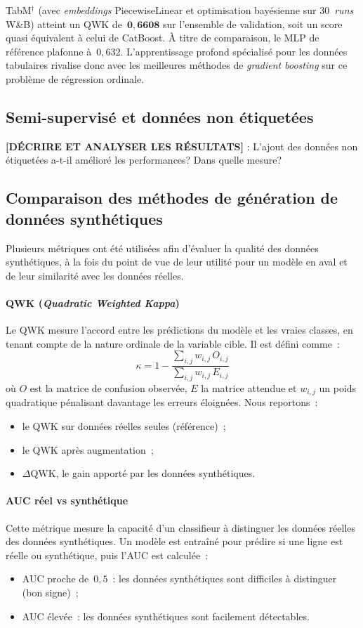 \documentclass[conference]{IEEEtran}
\begin{document}
TabM$^{\dagger}$ (avec \textit{embeddings} PiecewiseLinear et optimisation bayésienne sur 30~\textit{runs} W\&B) atteint un QWK de~$\mathbf{0{,}6608}$ sur l'ensemble de validation, soit un score quasi équivalent à celui de CatBoost. À titre de comparaison, le MLP de référence plafonne à~$0{,}632$. L'apprentissage profond spécialisé pour les données tabulaires rivalise donc avec les meilleures méthodes de \textit{gradient boosting} sur ce problème de régression ordinale.

\subsection{Semi-supervisé et données non étiquetées}
\textbf{[DÉCRIRE ET ANALYSER LES RÉSULTATS]} : L'ajout des données non étiquetées a-t-il amélioré les performances? Dans quelle mesure?

\subsection{Comparaison des méthodes de génération de données synthétiques}

Plusieurs métriques ont été utilisées afin d'évaluer la qualité des données synthétiques, à la fois du point de vue de leur utilité pour un modèle en aval et de leur similarité avec les données réelles.

\paragraph{QWK (\textit{Quadratic Weighted Kappa})}
Le QWK mesure l'accord entre les prédictions du modèle et les vraies classes, en tenant compte de la nature ordinale de la variable cible. Il est défini comme~:
\[
\kappa = 1 - \frac{\sum_{i,j} w_{i,j}\, O_{i,j}}{\sum_{i,j} w_{i,j}\, E_{i,j}}
\]
où $O$ est la matrice de confusion observée, $E$ la matrice attendue et $w_{i,j}$ un poids quadratique pénalisant davantage les erreurs éloignées. Nous reportons~:
\begin{itemize}
    \item le QWK sur données réelles seules (référence)~;
    \item le QWK après augmentation~;
    \item $\Delta$QWK, le gain apporté par les données synthétiques.
\end{itemize}

\paragraph{AUC réel vs synthétique}
Cette métrique mesure la capacité d'un classifieur à distinguer les données réelles des données synthétiques. Un modèle est entraîné pour prédire si une ligne est réelle ou synthétique, puis l'AUC est calculée~:
\begin{itemize}
    \item AUC proche de~$0{,}5$~: les données synthétiques sont difficiles à distinguer (bon signe)~;
    \item AUC élevée~: les données synthétiques sont facilement détectables.
\end{itemize}
\end{document}
